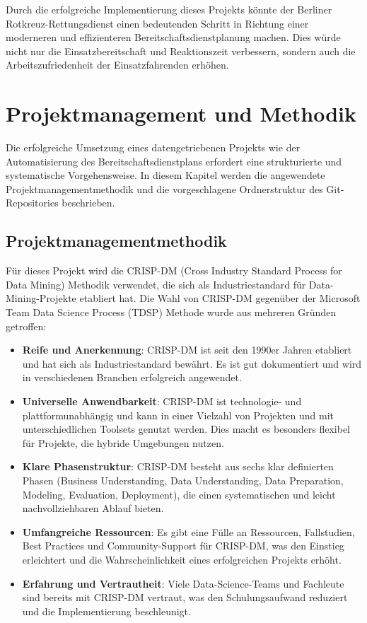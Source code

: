 \documentclass[%
pdftex,
oneside,			%
11pt,				%
parskip=half,		%
headheight = 12pt,	%
headsepline,		%
footsepline,		%
footheight = 16pt,	%
abstracton,		%
DIV=calc,		%
BCOR=8mm,		%
headinclude=false,	%
footinclude=false,	%
listof=totoc,		%
toc=bibliography,	%
]{scrreprt}	%
\begin{document}
    Durch die erfolgreiche Implementierung dieses Projekts könnte der Berliner Rotkreuz-Rettungsdienst einen bedeutenden Schritt in Richtung einer moderneren und effizienteren Bereitschaftsdienstplanung machen. 
    Dies würde nicht nur die Einsatzbereitschaft und Reaktionszeit verbessern, sondern auch die Arbeitszufriedenheit der Einsatzfahrenden erhöhen.
    

\chapter{Projektmanagement und Methodik}

    Die erfolgreiche Umsetzung eines datengetriebenen Projekts wie der Automatisierung des Bereitschaftsdienstplans erfordert eine strukturierte und systematische Vorgehensweise. 
    In diesem Kapitel werden die angewendete Projektmanagementmethodik und die vorgeschlagene Ordnerstruktur des Git-Repositories beschrieben.

    \section{Projektmanagementmethodik}

        Für dieses Projekt wird die CRISP-DM (Cross Industry Standard Process for Data Mining) Methodik verwendet, die sich als Industriestandard für Data-Mining-Projekte etabliert hat. 
        Die Wahl von CRISP-DM gegenüber der Microsoft Team Data Science Process (TDSP) Methode wurde aus mehreren Gründen getroffen:

        \begin{itemize}
            \item \textbf{Reife und Anerkennung}: CRISP-DM ist seit den 1990er Jahren etabliert und hat sich als Industriestandard bewährt. 
            Es ist gut dokumentiert und wird in verschiedenen Branchen erfolgreich angewendet.
            \item \textbf{Universelle Anwendbarkeit}: CRISP-DM ist technologie- und plattformunabhängig und kann in einer Vielzahl von Projekten und mit unterschiedlichen Toolsets genutzt werden. 
            Dies macht es besonders flexibel für Projekte, die hybride Umgebungen nutzen.
            \item \textbf{Klare Phasenstruktur}: CRISP-DM besteht aus sechs klar definierten Phasen (Business Understanding, Data Understanding, Data Preparation, Modeling, Evaluation, Deployment), die einen systematischen und leicht nachvollziehbaren Ablauf bieten.
            \item \textbf{Umfangreiche Ressourcen}: Es gibt eine Fülle an Ressourcen, Fallstudien, Best Practices und Community-Support für CRISP-DM, was den Einstieg erleichtert und die Wahrscheinlichkeit eines erfolgreichen Projekts erhöht.
            \item \textbf{Erfahrung und Vertrautheit}: Viele Data-Science-Teams und Fachleute sind bereits mit CRISP-DM vertraut, was den Schulungsaufwand reduziert und die Implementierung beschleunigt.
        \end{itemize}
\end{document}
